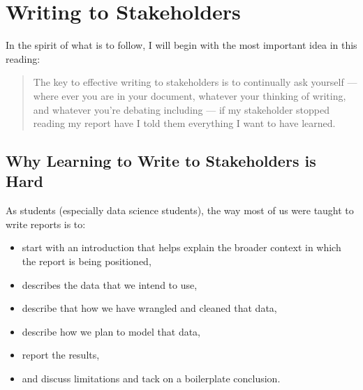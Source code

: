 \documentclass[letterpaper,10pt,english]{jupyterBook}
\begin{document}
\chapter{Writing to Stakeholders}
\label{\detokenize{40_in_practice/25_writing_to_stakeholders:writing-to-stakeholders}}\label{\detokenize{40_in_practice/25_writing_to_stakeholders::doc}}
\sphinxAtStartPar
In the spirit of what is to follow, I will begin with the most important idea in this reading:
\begin{quote}

\sphinxAtStartPar
The key to effective writing to stakeholders is to continually ask yourself — where ever you are in your document, whatever your thinking of writing, and whatever you’re debating including — if my stakeholder stopped reading my report  have I told them everything I want  to have learned.
\end{quote}


\section{Why Learning to Write to Stakeholders is Hard}
\label{\detokenize{40_in_practice/25_writing_to_stakeholders:why-learning-to-write-to-stakeholders-is-hard}}
\sphinxAtStartPar
As students (especially data science students), the way most of us were taught to write reports is to:
\begin{itemize}
\item {} 
\sphinxAtStartPar
start with an introduction that helps explain the broader context in which the report is being positioned,

\item {} 
\sphinxAtStartPar
describes the data that we intend to use,

\item {} 
\sphinxAtStartPar
describe that how we have wrangled and cleaned that data,

\item {} 
\sphinxAtStartPar
describe how we plan to model that data,

\item {} 
\sphinxAtStartPar
report the results,

\item {} 
\sphinxAtStartPar
and discuss limitations and tack on a boilerplate conclusion.

\end{itemize}
\end{document}

